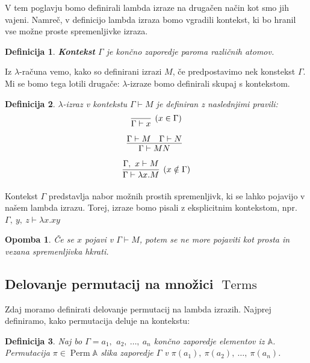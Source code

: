 \documentclass{article}
\DeclareMathOperator{\Perm}{Perm}
\DeclareMathOperator{\Terms}{Terms}
\newcommand{\inference}[3][]{\infer[#1]{#3}{#2}}
\newtheorem{opomba}{Opomba}
\newtheorem{definicija}{Definicija}
\begin{document}
\fi


V tem poglavju bomo definirali lambda izraze na drugačen način kot smo jih vajeni. Namreč, v definicijo lambda izraza bomo vgradili kontekst, ki bo hranil vse možne proste spremenljivke izraza.

\begin{definicija}
    \textbf{Kontekst} \(\Gamma\) je končno zaporedje paroma različnih atomov.        
\end{definicija}


Iz \(\lambda\)-računa vemo, kako so definirani izrazi \(M\), če predpostavimo nek konstekst \(\Gamma\). Mi se bomo tega lotili drugače: \(\lambda\)-izraze bomo definirali skupaj s kontekstom.

\begin{definicija}
    \(\lambda\)-izraz v kontekstu \(\Gamma \vdash M\) je definiran z naslednjimi pravili:
    \[
        \inference[(x \in \Gamma)]{}{\Gamma \vdash x}
    \]
    \[
        \inference{\Gamma \vdash M \quad \Gamma \vdash N}{\Gamma \vdash M N}
    \]
    \[
        \inference[(x \notin \Gamma)]{\Gamma,\ x \vdash M}{\Gamma \vdash \lambda x. M}    
    \]
\end{definicija}

Kontekst \(\Gamma\) predstavlja nabor možnih prostih spremenljivk, ki se lahko pojavijo v našem lambda izrazu. Torej, izraze bomo pisali z eksplicitnim kontekstom, npr. \(\Gamma,\ y,\ z \vdash \lambda x.xy\)

\begin{opomba}
    Če se \(x\) pojavi v \(\Gamma \vdash M\), potem se ne more pojaviti kot prosta in vezana spremenljivka hkrati.
\end{opomba}



\subsection{Delovanje permutacij na množici \(\Terms\)}

Zdaj moramo definirati delovanje permutacij na lambda izrazih. Najprej definiramo, kako permutacija deluje na kontekstu:

\begin{definicija}
    Naj bo \(\Gamma = a_1,\,\ a_2,\ \ldots,\ a_n\) končno zaporedje elementov iz \(\mathds{A}\). Permutacija \(\pi \in \Perm\mathds{A}\) slika zaporedje \(\Gamma\) v \(\pi(a_1), \ \pi(a_2), \ \ldots, \ \pi(a_n)\).
\end{definicija}
\end{document}
